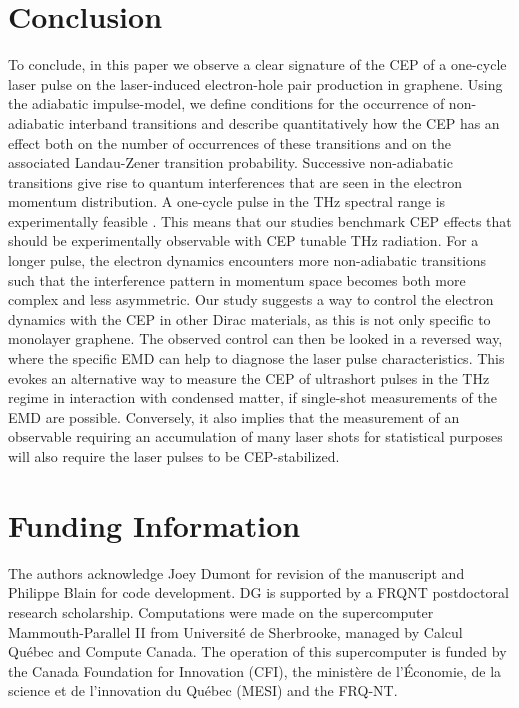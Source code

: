 \documentclass[9pt,twocolumn,twoside]{osajnl}
\begin{document}
\section{Conclusion}\label{section_conclusion}

To conclude, in this paper we observe a clear signature of the CEP of a one-cycle laser pulse on the laser-induced electron-hole pair production in graphene. 
Using the adiabatic impulse-model, we define conditions for the occurrence of non-adiabatic interband transitions and describe quantitatively how the CEP has an effect both on the number of occurrences of these transitions and on the associated Landau-Zener transition probability.
Successive non-adiabatic transitions give rise to quantum interferences that are seen in the electron momentum distribution. A one-cycle pulse in the THz spectral range is experimentally feasible \cite{Blanchard:07}. This means that our studies benchmark CEP effects that should be experimentally observable with CEP tunable THz radiation.
For a longer pulse, the electron dynamics encounters more non-adiabatic transitions such that the interference pattern in momentum space becomes both more complex and less asymmetric. Our study suggests a way to control the electron dynamics with the CEP in other Dirac materials, as this is not only specific to monolayer graphene.
The observed control can then be looked in a reversed way, where the specific EMD can help to diagnose the laser pulse characteristics. This evokes an alternative way to measure the CEP of ultrashort pulses in the THz regime in interaction with condensed matter, if single-shot measurements of the EMD are possible. Conversely, it also implies that the measurement of an observable requiring an accumulation of many laser shots for statistical purposes will also require the laser pulses to be CEP-stabilized. 




\section{Funding Information}

The authors acknowledge Joey Dumont for revision of the manuscript and Philippe Blain for code development.
DG is supported by a FRQNT postdoctoral research scholarship.
Computations were made on the supercomputer Mammouth-Parallel II from Universit\'e de Sherbrooke, managed by Calcul Qu\'ebec and Compute Canada. The operation of this supercomputer is funded by the Canada Foundation for Innovation (CFI), the minist\`ere de l'\'Economie, de la science et de l'innovation du Qu\'ebec (MESI) and  the FRQ-NT. 
\end{document}
